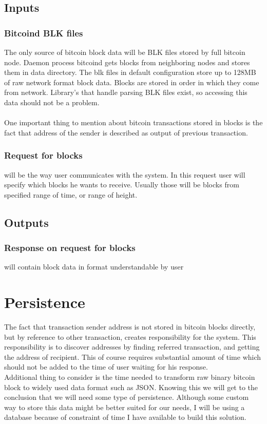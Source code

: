 \documentclass[12pt, en, eng, oneside]{mgr}
\begin{document}
\subsection{Inputs}
\subsubsection{Bitcoind BLK files}
The only source of bitcoin block data will be BLK files stored by full bitcoin node. Daemon process bitcoind gets blocks from neighboring nodes and stores them in data directory. The blk files in default configuration store up to 128MB of raw network format block data. Blocks are stored in order in which they come from network. Library's that handle parsing BLK files exist, so accessing this data should not be a problem.
\\
\\
One important thing to mention about bitcoin transactions stored in blocks is the fact that address of the sender is described as output of previous transaction.

\subsubsection{Request for blocks} will be the way user communicates with the system. In this request user will specify which blocks he wants to receive. Usually those will be blocks from specified range of time, or range of height.

\subsection{Outputs}
\subsubsection{Response on request for blocks} will contain block data in format understandable by user 


\section{Persistence}
The fact that transaction sender address is not stored in bitcoin blocks directly, but by reference to other transaction, creates responsibility for the system. This responsibility is to discover addresses by finding referred transaction, and getting the address of recipient. This of course requires substantial amount of time which should not be added to the time of user waiting for his response. 
\\
Additional thing to consider is the time needed to transform raw binary bitcoin block to widely used data format such as JSON. Knowing this we will get to the conclusion that we will need some type of persistence. Although some custom way to store this data might be better suited for our needs, I will be using a database because of constraint of time I have available to build this solution.
\end{document}
